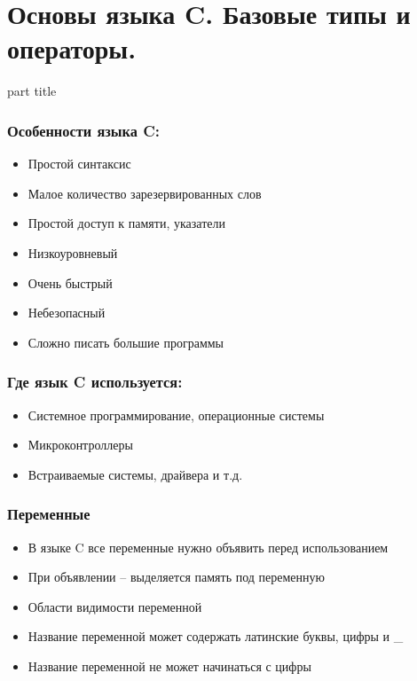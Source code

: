 \documentclass[14pt,pdf,hyperref={unicode}]{beamer}
\begin{document}
\section{Основы языка C. Базовые типы и операторы.}
\begin{frame}
\begin{center}
\begin{beamercolorbox}[sep=8pt,center]{part
title}
\insertsection
\end{beamercolorbox}
\end{center}
\end{frame}

\begin{frame}
\frametitle{Особенности языка C:} 
\begin{center}
\begin{itemize}
\item Простой синтаксис
\item Малое количество зарезервированных слов
\item Простой доступ к памяти, указатели
\item Низкоуровневый
\item Очень быстрый
\item Небезопасный
\item Сложно писать большие программы
\end{itemize}
\end{center}
\end{frame}

\begin{frame}
\frametitle{Где язык C используется:} 
\begin{center}
\begin{itemize}
\item Системное программирование, операционные системы
\item Микроконтроллеры
\item Встраиваемые системы, драйвера и т.д.
\end{itemize}
\end{center}
\end{frame}

\begin{frame}
\frametitle{Переменные} 
\begin{center}
\begin{itemize}
\item В языке C все переменные нужно объявить перед использованием
\item При объявлении -- выделяется память под переменную
\item Области видимости переменной
\item Название переменной может содержать латинские буквы, цифры и \_
\item Название переменной не может начинаться с цифры
\end{itemize}
\end{center}
\end{frame}
\end{document}
